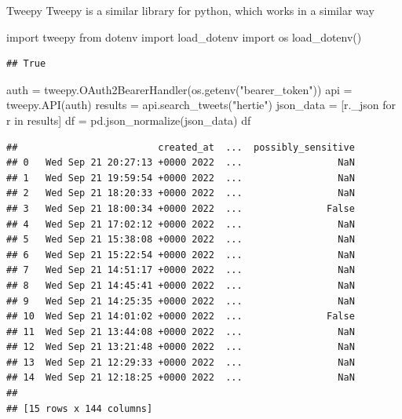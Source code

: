 \documentclass[
  10pt,
  ignorenonframetext,
  aspectratio=169]{beamer}
\newenvironment{Shaded}{\begin{snugshade}}{\end{snugshade}}
\newcommand{\ControlFlowTok}[1]{\textcolor[rgb]{0.94,0.87,0.69}{#1}}
\newcommand{\ImportTok}[1]{\textcolor[rgb]{0.80,0.80,0.80}{#1}}
\newcommand{\KeywordTok}[1]{\textcolor[rgb]{0.94,0.87,0.69}{#1}}
\newcommand{\NormalTok}[1]{\textcolor[rgb]{0.80,0.80,0.80}{#1}}
\newcommand{\OperatorTok}[1]{\textcolor[rgb]{0.94,0.94,0.82}{#1}}
\newcommand{\StringTok}[1]{\textcolor[rgb]{0.80,0.58,0.58}{#1}}
\begin{document}
\begin{frame}[fragile]{Tweepy}
\protect\hypertarget{tweepy}{}
Tweepy is a similar library for python, which works in a similar way

\scriptsize

\begin{Shaded}
\begin{Highlighting}[]
\ImportTok{import}\NormalTok{ tweepy}
\ImportTok{from}\NormalTok{ dotenv }\ImportTok{import}\NormalTok{ load\_dotenv}
\ImportTok{import}\NormalTok{ os}
\NormalTok{load\_dotenv()}
\end{Highlighting}
\end{Shaded}

\begin{verbatim}
## True
\end{verbatim}

\begin{Shaded}
\begin{Highlighting}[]
\NormalTok{auth }\OperatorTok{=}\NormalTok{ tweepy.OAuth2BearerHandler(os.getenv(}\StringTok{"bearer\_token"}\NormalTok{))}
\NormalTok{api }\OperatorTok{=}\NormalTok{ tweepy.API(auth)}
\NormalTok{results }\OperatorTok{=}\NormalTok{ api.search\_tweets(}\StringTok{"hertie"}\NormalTok{)}
\NormalTok{json\_data }\OperatorTok{=}\NormalTok{ [r.\_json }\ControlFlowTok{for}\NormalTok{ r }\KeywordTok{in}\NormalTok{ results]}
\NormalTok{df }\OperatorTok{=}\NormalTok{ pd.json\_normalize(json\_data)}
\NormalTok{df}
\end{Highlighting}
\end{Shaded}

\begin{verbatim}
##                         created_at  ...  possibly_sensitive
## 0   Wed Sep 21 20:27:13 +0000 2022  ...                 NaN
## 1   Wed Sep 21 19:59:54 +0000 2022  ...                 NaN
## 2   Wed Sep 21 18:20:33 +0000 2022  ...                 NaN
## 3   Wed Sep 21 18:00:34 +0000 2022  ...               False
## 4   Wed Sep 21 17:02:12 +0000 2022  ...                 NaN
## 5   Wed Sep 21 15:38:08 +0000 2022  ...                 NaN
## 6   Wed Sep 21 15:22:54 +0000 2022  ...                 NaN
## 7   Wed Sep 21 14:51:17 +0000 2022  ...                 NaN
## 8   Wed Sep 21 14:45:41 +0000 2022  ...                 NaN
## 9   Wed Sep 21 14:25:35 +0000 2022  ...                 NaN
## 10  Wed Sep 21 14:01:02 +0000 2022  ...               False
## 11  Wed Sep 21 13:44:08 +0000 2022  ...                 NaN
## 12  Wed Sep 21 13:21:48 +0000 2022  ...                 NaN
## 13  Wed Sep 21 12:29:33 +0000 2022  ...                 NaN
## 14  Wed Sep 21 12:18:25 +0000 2022  ...                 NaN
## 
## [15 rows x 144 columns]
\end{verbatim}
\end{frame}
\end{document}
